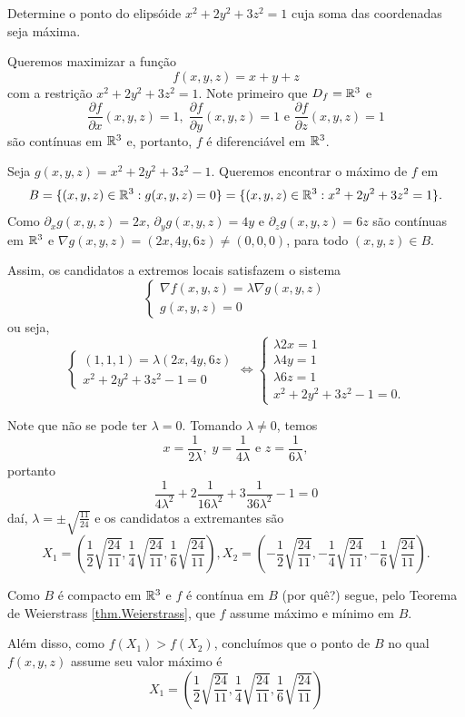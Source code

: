 \begin{example}
    Determine o ponto do elipsóide \(x^2 + 2y^2 + 3z^2 = 1\) cuja soma das coordenadas seja máxima.

    Queremos maximizar a função \[f(x,y,z) = x + y + z\] com a restrição \(x^2 + 2y^2 + 3z^2 = 1\). Note primeiro que \(D_f = \mathbb{R}^3\) e \[\frac{\partial f}{\partial x}(x,y,z) = 1, \; \frac{\partial f}{\partial y}(x,y,z) = 1 \text{ e } \frac{\partial f}{\partial z}(x,y,z) = 1\] são contínuas em \(\mathbb{R}^3\) e, portanto, \(f\) é diferenciável em \(\mathbb{R}^3\).

    Seja \(g(x,y,z) = x^2 + 2y^2 + 3z^2 - 1\). Queremos encontrar o máximo de \(f\) em \[B = \{(x,y,z)\in\mathbb{R}^3 : g(x,y,z) = 0\} = \{(x,y,z)\in\mathbb{R}^3 : x^2 + 2y^2 + 3z^2 = 1\}.\] Como \(\partial_x g(x,y,z) = 2x\), \(\partial_y g(x,y,z) = 4y\) e \(\partial_z g(x,y,z) = 6z\) são contínuas em \(\mathbb{R}^3\) e \(\nabla g(x,y,z) = (2x,4y,6z)\neq(0,0,0)\), para todo \((x,y,z)\in B\).

    Assim, os candidatos a extremos locais satisfazem o sistema \[\begin{cases}
        \nabla f(x,y,z) = \lambda \nabla g(x,y,z) \\
        g(x,y,z) = 0
    \end{cases}\] ou seja, \[\begin{cases}
        (1,1,1) = \lambda (2x,4y,6z) \\
        x^2 + 2y^2 + 3z^2 - 1 = 0
    \end{cases} \Leftrightarrow \begin{cases}
        \lambda 2x = 1 \\
        \lambda 4y = 1 \\
        \lambda 6z = 1 \\
        x^2 + 2y^2 + 3z^2 - 1= 0.
    \end{cases}\] 
    
    Note que não se pode ter \(\lambda = 0\). Tomando \(\lambda \neq 0\), temos \[x = \frac{1}{2\lambda},\; y = \frac{1}{4\lambda} \text{ e } z = \frac{1}{6\lambda},\] portanto \[\frac{1}{4\lambda^2} + 2\frac{1}{16\lambda^2} + 3\frac{1}{36\lambda^2} - 1 =0\] daí, \(\lambda = \pm \sqrt{\frac{11}{24}}\) e os candidatos a extremantes são \[X_1 = \left( \frac{1}{2}\sqrt{\frac{24}{11}}, \frac{1}{4}\sqrt{\frac{24}{11}}, \frac{1}{6}\sqrt{\frac{24}{11}} \right), X_2 = \left( - \frac{1}{2}\sqrt{\frac{24}{11}}, - \frac{1}{4}\sqrt{\frac{24}{11}}, - \frac{1}{6}\sqrt{\frac{24}{11}} \right).\] 
    
    Como \(B\) é compacto em \(\mathbb{R}^3\) e \(f\) é contínua em \(B\) (por quê?) segue, pelo Teorema de Weierstrass \ref{thm.Weierstrass}, que \(f\) assume máximo e mínimo em \(B\).

    Além disso, como \(f(X_1) > f(X_2)\), concluímos que o ponto de \(B\) no qual \(f(x,y,z)\) assume seu valor máximo é \[X_1 = \left( \frac{1}{2}\sqrt{\frac{24}{11}}, \frac{1}{4}\sqrt{\frac{24}{11}}, \frac{1}{6}\sqrt{\frac{24}{11}} \right)\]
\end{example}


